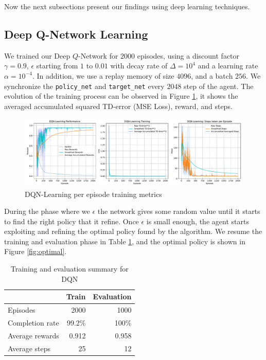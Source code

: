 Now the next subsections present our findings using deep learning techniques.
\subsection{Deep Q-Network Learning}
We trained our  Deep $Q$-Network for $2000$ episodes, using a discount factor $\gamma=0.9$, $\epsilon$ starting from $1$ to $0.01$ with decay rate of $\Delta=10^4$ and a learning rate $\alpha=10^{-4}$. In addition, we use a replay memory of size $4096$, and a batch $256$. We synchronize the \texttt{policy\_net} and \texttt{target\_net} every $2048$ step of the agent. The evolution of the training process can be observed in Figure \ref{fig:dqnlog}, it shows the averaged accumulated squared TD-error (MSE Loss), reward, and steps.
\begin{figure}[H]
	\centering
	\includegraphics[width=\linewidth]{figures/DQNLearning_episode.pdf}
	\caption{DQN-Learning per episode training metrics}
	\label{fig:dqnlog}
\end{figure}
During the phase where we $\epsilon$ the network gives some random value until it starts to find the right policy that it refine. Once $\epsilon$ is small enough, the agent starts exploiting and refining the optimal policy found by the algorithm. We resume the training and evaluation phase in Table \ref{tab:summ_dqn}, and the optimal policy is shown in Figure \ref{fig:optimal}.
\begin{table}
	\centering
	\begin{tabular}{@{}lrr@{}}
		\cmidrule(l){2-3}
		& Train & Evaluation \\ \midrule
		Episodes        &  2000      &  1000          \\
		Completion rate &   99.2\%    &  100\%           \\
		Average rewards &   0.912    &    0.958        \\
		Average steps   &    25   &     12       \\ \bottomrule
	\end{tabular}
	\caption{Training and evaluation summary for DQN}
	\label{tab:summ_dqn}
\end{table}


